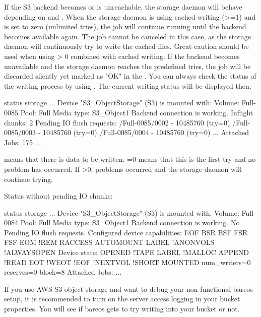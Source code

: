 If the S3 backend becomes or is unreachable, the storage daemon will behave depending on  and .
When the storage daemon is using cached writing (>=1) and  is set to zero (unlimited tries), the job will continue running until the backend becomes available again. The job cannot be canceled in this case, as the storage daemon will continuously try to write the cached files.
Great caution should be used when using  > 0 combined with cached writing. If the backend becomes unavailable and the storage daemon reaches the predefined tries, the job will be discarded silently yet marked as "OK" in the \bareosDir.
You can always check the status of the writing process by using . The current writing status will be displayed then:
\begin{bconsole}{status storage}
...
Device "S3_ObjectStorage" (S3) is mounted with:
    Volume:      Full-0085
    Pool:        Full
    Media type:  S3_Object1
Backend connection is working.
Inflight chunks: 2
Pending IO flush requests:
   /Full-0085/0002 - 10485760 (try=0)
   /Full-0085/0003 - 10485760 (try=0)
   /Full-0085/0004 - 10485760 (try=0)
...
Attached Jobs: 175
...

\end{bconsole}
 means that there is data to be written. =0 means that this is the first try and no problem has occurred. If >0, problems occurred and the storage daemon will continue trying.

Status without pending IO chunks:
\begin{bconsole}{status storage}
...
Device "S3_ObjectStorage" (S3) is mounted with:
    Volume:      Full-0084
    Pool:        Full
    Media type:  S3_Object1
Backend connection is working.
No Pending IO flush requests.
Configured device capabilities:
  EOF BSR BSF FSR FSF EOM !REM RACCESS AUTOMOUNT LABEL !ANONVOLS !ALWAYSOPEN
Device state:
  OPENED !TAPE LABEL !MALLOC APPEND !READ EOT !WEOT !EOF !NEXTVOL !SHORT MOUNTED
  num_writers=0 reserves=0 block=8
Attached Jobs:
...
\end{bconsole}

If you use AWS S3 object storage and want to debug your non-functional bareos setup, it is recommended to turn on the server access logging in your bucket properties. You will see if bareos gets to try writing into your bucket or not.